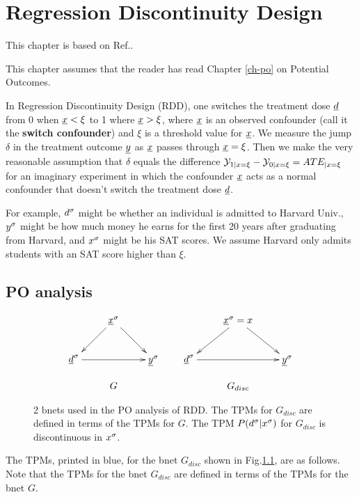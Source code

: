 \chapter{Regression Discontinuity Design}
\label{ch-reg-dis}

This chapter is based on
Ref.\cite{book-mixtape}.

This chapter assumes that the
reader has read Chapter \ref{ch-po}
on Potential Outcomes.

In Regression Discontinuity Design (RDD),
one switches the treatment
dose ${\underline{d}}$ from 0 when ${\underline{x}}<\xi$ to 1 
where ${\underline{x}}>\xi$,  where  ${\underline{x}}$ is an
observed confounder (call
it the {\bf switch confounder})
and $\xi$ is a threshold value
for ${\underline{x}}$.
We measure the jump $\delta$
in the treatment outcome ${\underline{y}}$
as ${\underline{x}}$ passes through
${\underline{x}}=\xi$.
Then we make the
very reasonable assumption
that $\delta$ equals 
the difference ${\cal Y}_{1|x=\xi}-
{\cal Y}_{0|x=\xi}=ATE_{|x=\xi}$
for an imaginary experiment in which
the confounder ${\underline{x}}$
acts as a normal confounder
that doesn't switch 
 the treatment dose ${\underline{d}}$.

For example,
$d^\sigma$
might be whether
an individual is admitted
to Harvard Univ., $y^\sigma$
might be how much
money
he earns for the first 20 years
after graduating from
Harvard, and $x^\sigma$
might be his SAT scores.
We assume Harvard only admits 
students with
an SAT score higher
than $\xi$.



\section{PO analysis}

\begin{figure}[h!]
$$
\begin{array}{ccc}
\xymatrix{
&\rvx^\s\ar[dr]\ar[dl]
\\
\rvd^\s\ar[rr]&&\rvy^\s
}
&&
\xymatrix{
&\rvx^\s=x\ar[dr]\ar[dl]
\\
\rvd^\s\ar[rr]&&\rvy^\s
}
\\
\\
G&&G_{disc}
\end{array}
$$
\caption{
2 bnets used in the
PO analysis of RDD. The 
TPMs for $G_{disc}$
are  defined in terms of the TPMs for
$G$. The TPM 
$P(d^\sigma|x^\sigma)$ 
for $G_{disc}$
is discontinuous in $x^\sigma$.}
\label{fig-reg-dis-bnets}
\end{figure}

The TPMs,
printed in blue,
for the 
bnet
$G_{disc}$
shown
in Fig.\ref{fig-reg-dis-bnets},
are as follows.
Note
that the
TPMs for the
bnet $G_{disc}$
are defined in 
terms
of the TPMs for the bnet $G$.



